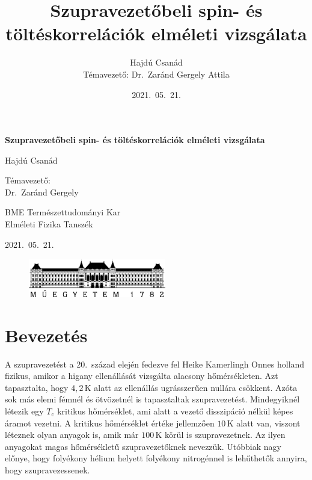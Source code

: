 \documentclass[a4paper,12pt,titlepage]{article}
\title{\bf Szupravezetőbeli spin- és töltéskorrelációk elméleti vizsgálata}
\author{Hajdú Csanád \\ \small Témavezető: Dr.\ Zaránd Gergely Attila}
\date{2021.\ 05.\ 21.}
\begin{document}
\begin{titlepage}
\begin{center}
	\vspace*{1cm}
	\textbf{\huge Szupravezetőbeli spin- és töltéskorrelációk elméleti vizsgálata}

	\vspace{3.5cm}

	\Large
	Hajdú Csanád

	\vspace{2.5cm}
	{\normalsize Témavezető:} \\
	Dr.\ Zaránd Gergely

	\vfill

	BME Természettudományi Kar \\
	Elméleti Fizika Tanszék

	\vspace{1.5cm}

	2021.\ 05.\ 21.

	\begin{figure}[b]
		\centering
		\includegraphics[width=6cm]{bme-logo.png}
	\end{figure}
\end{center}
\end{titlepage}

\null
\thispagestyle{empty}
\addtocounter{page}{-1}
\newpage

\tableofcontents \newpage


\section{Bevezetés}

A szupravezetést a 20.\ század elején fedezve fel Heike Kamerlingh Onnes holland fizikus, amikor a higany ellenállását vizsgálta alacsony hőmérsékleten.  Azt tapasztalta, hogy $4,2$\,K alatt az ellenállás ugrásszerűen nullára csökkent.  Azóta sok más elemi fémnél és ötvözetnél is tapasztaltak szupravezetést.  Mindegyiknél létezik egy $T_\text{c}$ kritikus hőmérséklet, ami alatt a vezető disszipáció nélkül képes áramot vezetni.  A kritikus hőmérséklet értéke jellemzően $10$\,K alatt van, viszont léteznek olyan anyagok is, amik már $100$\,K körül is szupravezetnek.  Az ilyen anyagokat magas hőmérsékletű szupravezetőknek nevezzük.  Utóbbiak nagy előnye, hogy folyékony hélium helyett folyékony nitrogénnel is lehűthetők annyira, hogy szupravezessenek.
\end{document}
